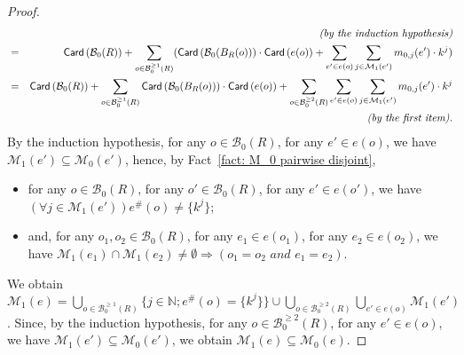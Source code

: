 \documentclass{article}
\theoremstyle{plain}
\newcommand{\Nat}{\ensuremath{\mathbb{N}}}
\newcommand{\Card}[1]{\textsf{Card}\left( #1 \right)}
\newcommand{\boxesatzero}[1]{\mathcal{B}_{0}(#1)}
\newcommand{\boxesatzerogeq}[2]{\mathcal{B}_0^{\geq #2}(#1)}
\begin{document}
\begin{proof}
\begin{eqnarray*}
& & \textit{(by the induction hypothesis)} \allowdisplaybreaks \\
& = & \Card{\boxesatzero{R}} + \sum_{o \in \boxesatzerogeq{R}{1}} (\Card{\boxesatzero{B_R(o)}} \cdot \Card{e(o)} + \sum_{e' \in e(o)} \sum_{j \in \mathcal{M}_1(e')} m_{0, j}(e') \cdot k^j) \allowdisplaybreaks \\
& = & \Card{\boxesatzero{R}} + \sum_{o \in \boxesatzerogeq{R}{1}} \Card{\boxesatzero{B_R(o)}} \cdot \Card{e(o)} + \sum_{o \in \boxesatzerogeq{R}{2}} \sum_{e' \in e(o)} \sum_{j \in \mathcal{M}_1(e')} m_{0, j}(e') \cdot k^j \\
& & \textit{(by the first item).}
\end{eqnarray*}
By the induction hypothesis, for any $o \in \boxesatzero{R}$, for any $e' \in e(o)$, we have $\mathcal{M}_1(e') \subseteq \mathcal{M}_0(e')$, hence, by Fact~\ref{fact: M_0 pairwise disjoint},
\begin{itemize}
\item for any $o \in \boxesatzero{R}$, for any $o' \in \boxesatzero{R}$, for any $e' \in e(o')$, we have $(\forall j \in \mathcal{M}_1(e')) e^\#(o) \not= \{ k^j \}$;
\item and, for any $o_1, o_2 \in \boxesatzero{R}$, for any $e_1 \in e(o_1)$, for any $e_2 \in e(o_2)$, we have $\mathcal{M}_1(e_1) \cap \mathcal{M}_1(e_2) \not= \emptyset \Rightarrow (o_1 = o_2 \textit{ and } e_1 = e_2)$.
\end{itemize}
We obtain $\mathcal{M}_1(e) = \bigcup_{o \in \boxesatzerogeq{R}{1}} \{ j \in \Nat ; e^\#(o) = \{ k^j \} \} \cup \bigcup_{o \in \boxesatzerogeq{R}{2}} \bigcup_{e' \in e(o)} \mathcal{M}_1(e')$. Since, by the induction hypothesis, for any $o \in \boxesatzerogeq{R}{2}$, for any $e' \in e(o)$, we have $\mathcal{M}_1(e') \subseteq \mathcal{M}_0(e')$, we obtain $\mathcal{M}_1(e) \subseteq \mathcal{M}_0(e)$.
\end{proof}
\end{document}
